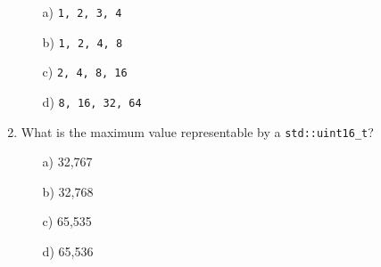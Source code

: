 \documentclass{article}
\begin{document}
\begin{enumerate}
	\begin{itemize}
		\item[a)] \texttt{1, 2, 3, 4}
		\item[b)] \textcolor{BrickRed}{\texttt{1, 2, 4, 8}}
		\item[c)] \texttt{2, 4, 8, 16}
		\item[d)] \texttt{8, 16, 32, 64} 
	\end{itemize}
	\item What is the maximum value representable by a \texttt{std::uint16\_t}? \begin{itemize}
		\item[a)] 32,767
		\item[b)] 32,768
		\item[c)] \textcolor{BrickRed}{65,535}
		\item[d)] 65,536
	\end{itemize}
\end{enumerate}
\end{document}
